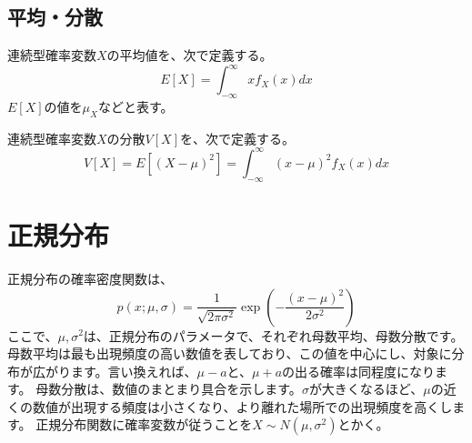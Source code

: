 \subsection{平均・分散}
\begin{defi}
 連続型確率変数$X$の平均値を、次で定義する。
 \begin{equation*}
  E[X] = \int_{-\infty}^{\infty} xf_X(x)dx
 \end{equation*}
 $E[X]$の値を$\mu_X$などと表す。
\end{defi}

\begin{defi}
 連続型確率変数$X$の分散$V[X]$を、次で定義する。
 \begin{equation*}
  V[X] = E[(X-\mu)^2] = \int_{-\infty}^{\infty} (x-\mu)^2 f_X(x)dx
 \end{equation*}
\end{defi}



\section{正規分布}
正規分布の確率密度関数は、
\begin{equation}
p(x;\mu,\sigma)=\frac{1}{\sqrt{2\pi\sigma^2}}\exp\left(-\frac{(x-\mu)^2}{2\sigma^2} \right)
\end{equation}
ここで、$\mu,\sigma^2$は、正規分布のパラメータで、それぞれ母数平均、母数分散です。
母数平均は最も出現頻度の高い数値を表しており、この値を中心にし、対象に分布が広がります。言い換えれば、$\mu-a$と、$\mu+a$の出る確率は同程度になります。
母数分散は、数値のまとまり具合を示します。$\sigma$が大きくなるほど、$\mu$の近くの数値が出現する頻度は小さくなり、より離れた場所での出現頻度を高くします。
正規分布関数に確率変数が従うことを$X\sim N(\mu,\sigma^2)$とかく。



